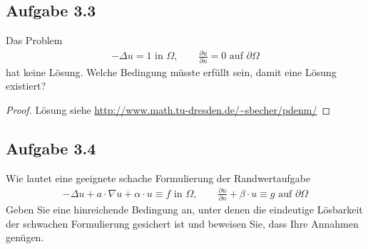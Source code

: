 \subsection{Aufgabe 3.3}
Das Problem 
\begin{align*}
	-\Delta u=1\text{ in }\Omega,\qquad\frac{\partial u}{\partial n}=0\text{ auf }\partial\Omega
\end{align*}
hat keine Lösung. 
Welche Bedingung müsste erfüllt sein, damit eine Lösung existiert?

\begin{proof}
	Lösung siehe
	\url{http://www.math.tu-dresden.de/~sbecher/pdenm/}
\end{proof}

\subsection{Aufgabe 3.4}
Wie lautet eine geeignete schache Formulierung der Randwertaufgabe
\begin{align*}
	-\Delta u+a\cdot\nabla u+\alpha\cdot u\equiv f\text{ in }\Omega,\qquad\frac{\partial u}{\partial n}+\beta\cdot u\equiv g\text{ auf } \partial\Omega
\end{align*}
Geben Sie eine hinreichende Bedingung an, unter denen die eindeutige Lösbarkeit der schwachen Formulierung gesichert ist und beweisen Sie, dass Ihre Annahmen genügen.

